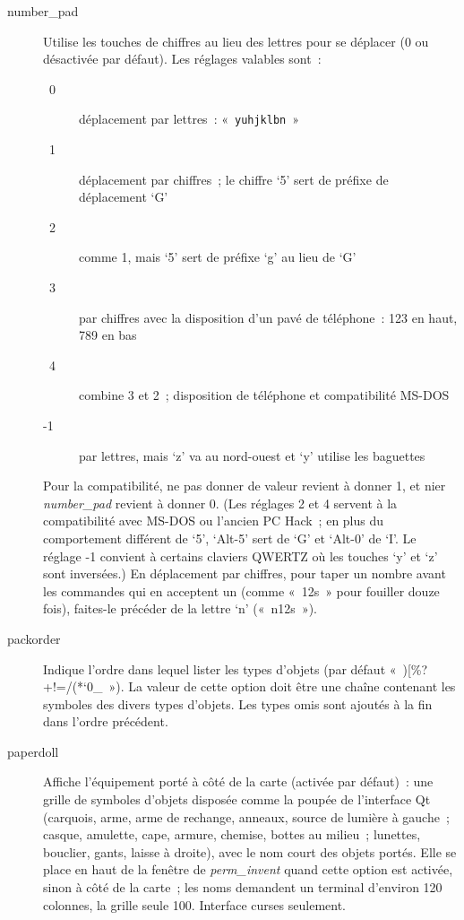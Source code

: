 \documentclass[titlepage]{article}
\begin{document}
\begin{description}
\item[{number\_pad}]
Utilise les touches de chiffres au lieu des lettres pour se déplacer (0 ou
désactivée par défaut).
Les réglages valables sont~:
\begin{description}
\item[{~0}]
déplacement par lettres~: «~\texttt{yuhjklbn}~» 
\item[{~1}]
déplacement par chiffres~; le chiffre `5' sert de préfixe de
déplacement `G'
\item[{~2}]
comme 1, mais `5' sert de préfixe `g' au lieu de `G'
\item[{~3}]
par chiffres avec la disposition d'un pavé de téléphone~: 123 en haut, 789
en bas
\item[{~4}]
combine 3 et 2~; disposition de téléphone et compatibilité MS-DOS
\item[{-1}]
par lettres, mais `z' va au nord-ouest et `y' utilise les
baguettes
\end{description}
Pour la compatibilité, ne pas donner de valeur revient à donner 1, et nier
\textit{number\_pad}
revient à donner 0.
(Les réglages 2 et 4 servent à la compatibilité avec MS-DOS ou l'ancien PC
Hack~; en plus du comportement différent de `5', `Alt-5' sert
de `G' et `Alt-0' de `I'.
Le réglage -1 convient à certains claviers QWERTZ où les touches `y'
et `z' sont inversées.)
En déplacement par chiffres, pour taper un nombre avant les commandes qui
en acceptent un (comme «~12s~» pour fouiller douze fois),
faites-le précéder de la lettre `n' («~n12s~»).

\item[{packorder}]
Indique l'ordre dans lequel lister les types d'objets (par défaut
«~\textquotedbl{})[\%?+!=/(*`0\_~»).
La valeur de cette option doit être une chaîne contenant les symboles des
divers types d'objets.
Les types omis sont ajoutés à la fin dans l'ordre précédent.

\item[{paperdoll}]
Affiche l'équipement porté à côté de la carte (activée par défaut)~:
une grille de symboles d'objets disposée comme la poupée de l'interface Qt
(carquois, arme, arme de rechange, anneaux, source de lumière à gauche~;
casque, amulette, cape, armure, chemise, bottes au milieu~; lunettes,
bouclier, gants, laisse à droite), avec le nom court des objets portés.
Elle se place en haut de la fenêtre de
\textit{perm\_invent}
quand cette option est activée, sinon à côté de la carte~;
les noms demandent un terminal d'environ 120 colonnes, la grille seule 100.
Interface curses seulement.


\end{description}
\end{document}
